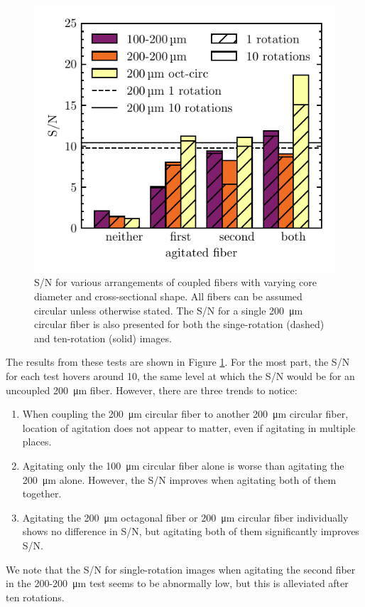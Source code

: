 \documentclass[twocolumn]{emulateapj}
\begin{document}
\begin{figure}
\centering
	\includegraphics[width=\columnwidth]{images/coupled_fibers.pdf}
	\caption{S/N for various arrangements of coupled fibers with varying core diameter and cross-sectional shape. All fibers can be assumed circular unless otherwise stated. The S/N for a single \SI{200}{\micro\meter} circular fiber is also presented for both the singe-rotation (dashed) and ten-rotation (solid) images.}
\label{fig:coupled_fibers}
\end{figure}

The results from these tests are shown in Figure \ref{fig:coupled_fibers}. For the most part, the S/N for each test hovers around 10, the same level at which the S/N would be for an uncoupled \SI{200}{\micro\meter} fiber. However, there are three trends to notice:
\begin{enumerate}
\item When coupling the \SI{200}{\micro\meter} circular fiber to another \SI{200}{\micro\meter} circular fiber, location of agitation does not appear to matter, even if agitating in multiple places.
\item Agitating only the \SI{100}{\micro\meter} circular fiber alone is worse than agitating the \SI{200}{\micro\meter} alone. However, the S/N improves when agitating both of them together.
\item Agitating the \SI{200}{\micro\meter} octagonal fiber or \SI{200}{\micro\meter} circular fiber individually shows no difference in S/N, but agitating both of them significantly improves S/N.
\end{enumerate}
We note that the S/N for single-rotation images when agitating the second fiber in the 200-\SI{200}{\micro\meter} test seems to be abnormally low, but this is alleviated after ten rotations.
\end{document}
